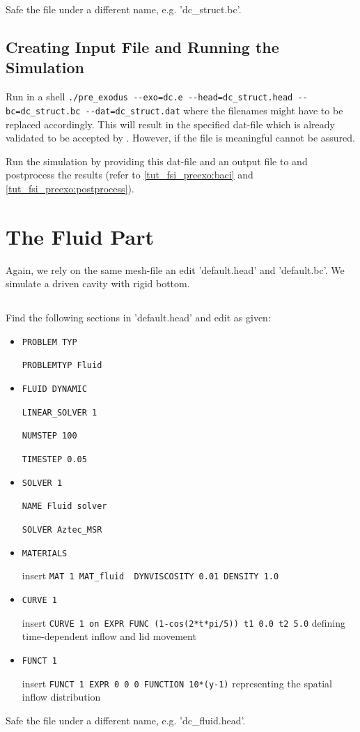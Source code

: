 Safe the file under a different name, e.g. 'dc\_struct.bc'.

\subsection{Creating \baci{} Input File and Running the Simulation}
Run in a shell \verb|./pre_exodus --exo=dc.e --head=dc_struct.head --bc=dc_struct.bc --dat=dc_struct.dat| where the filenames might have to be replaced accordingly. This will result in the specified dat-file which is already validated to be accepted by \baci{}. However, if the file is meaningful cannot be assured.

Run the simulation by providing this dat-file and an output file to \baci{} and postprocess the results (refer to \ref{tut_fsi_preexo:baci} and \ref{tut_fsi_preexo:postprocess}).

\section{The Fluid Part}
Again, we rely on the same mesh-file an edit 'default.head' and 'default.bc'. We simulate a driven cavity with rigid bottom.

\subsection{\head}
Find the following sections in 'default.head' and edit as given:

\begin{itemize}
 \item \verb|PROBLEM TYP|

 \verb|PROBLEMTYP Fluid|

 \item \verb|FLUID DYNAMIC|

 \verb|LINEAR_SOLVER 1|

 \verb|NUMSTEP 100|

 \verb|TIMESTEP 0.05|

 \item \verb|SOLVER 1|

 \verb|NAME Fluid solver|

 \verb|SOLVER Aztec_MSR|

 \item \verb|MATERIALS|

  insert \verb|MAT 1 MAT_fluid  DYNVISCOSITY 0.01 DENSITY 1.0|

  \item \verb|CURVE 1|

  insert \verb|CURVE 1 on EXPR FUNC (1-cos(2*t*pi/5)) t1 0.0 t2 5.0| defining time-dependent inflow and lid movement

   \item \verb|FUNCT 1|

  insert \verb|FUNCT 1 EXPR 0 0 0 FUNCTION 10*(y-1)| representing the spatial inflow distribution

\end{itemize}
Safe the file under a different name, e.g. 'dc\_fluid.head'.

